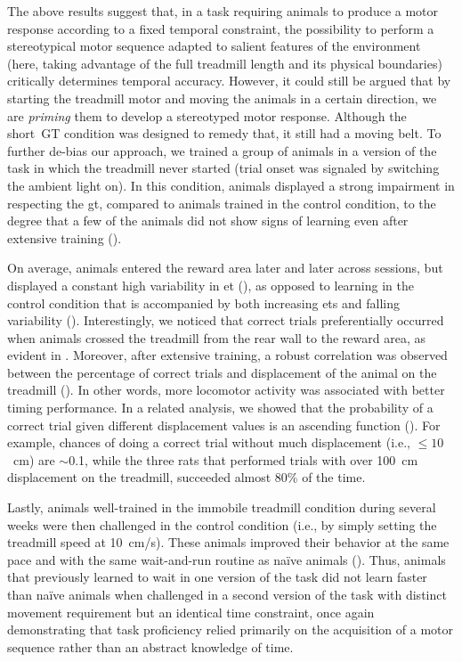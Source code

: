 The above results suggest that, in a task requiring animals to produce a motor response according to a fixed temporal constraint, the possibility to perform a stereotypical motor sequence adapted to salient features of the environment (here, taking advantage of the full treadmill length and its physical boundaries) critically determines temporal accuracy.
However, it could still be argued that by starting the treadmill motor and moving the animals in a certain direction, we are \textit{priming} them to develop a stereotyped motor response.
Although the short~GT condition was designed to remedy that, it still had a moving belt.
To further de-bias our approach, we trained a group of animals in a version of the task in which the treadmill never started (trial onset was signaled by switching the ambient light on).
In this condition, animals displayed a strong impairment in respecting the \gls{gt}, compared to animals trained in the control condition, to the degree that a few of the animals did not show signs of learning even after extensive training ().

On average, animals entered the reward area later and later across sessions, but displayed a constant high variability in \gls{et} (), as opposed to learning in the control condition that is accompanied by both increasing \glspl{et} and falling variability ().
Interestingly, we noticed that correct trials preferentially occurred when animals crossed the treadmill from the rear wall to the reward area, as evident in .
Moreover, after extensive training, a robust correlation was observed between the percentage of correct trials and displacement of the animal on the treadmill ().
In other words, more locomotor activity was associated with better timing performance.
In a related analysis, we showed that the probability of a correct trial given different displacement values is an ascending function ().
For example, chances of doing a correct trial without much displacement (i.e., $\leq 10$~cm) are $\sim$0.1, while the three rats that performed trials with over 100~cm displacement on the treadmill, succeeded almost 80\% of the time.
\par
Lastly, animals well-trained in the immobile treadmill condition during several weeks were then challenged in the control condition (i.e., by simply setting the treadmill speed at 10~cm/s).
These animals improved their behavior at the same pace and with the same wait-and-run routine as na\"ive animals ().
Thus, animals that previously learned to wait in one version of the task did not learn faster than na\"ive animals when challenged in a second version of the task with distinct movement requirement but an identical time constraint, once again demonstrating that task proficiency relied primarily on the acquisition of a motor sequence rather than an abstract knowledge of time.